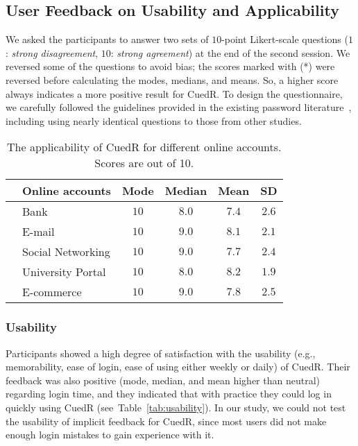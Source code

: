 \subsection{User Feedback on Usability and Applicability}\label{feedback}

We asked the participants to answer two sets of $10$-point Likert-scale questions ($1$: \textit{strong disagreement}, $10$: \textit{strong agreement}) at the end of the second session. We reversed some of the questions to avoid bias; the scores marked with (*) were reversed before calculating the modes, medians, and means. So, a higher score always indicates a more positive result for CuedR. To design the questionnaire, we carefully followed the guidelines provided in the existing password literature~\cite{geopass,ccp,passpoint3}, including using nearly identical questions to those from other studies.

\begin{table}[b]
\renewcommand{\arraystretch}{1.3}
\caption{The applicability of CuedR for different online
  accounts. Scores are out of 10.}
\vspace{0.2cm}
\centering
\begin{tabular}{c@{}lcccc}
\hline
\hspace{0.2cm}&\multicolumn{1}{c}{Online accounts}&Mode&Median&Mean&SD\\ 
\hline
& Bank&$10$&$8.0$&$7.4$&$2.6$\\ 
\cline{2-6}
& E-mail&$10$&$9.0$&$8.1$&$2.1$\\ 
\cline{2-6}
& Social Networking&$10$&$9.0$&$7.7$&$2.4$\\ 
\cline{2-6}
& University Portal&$10$&$8.0$&$8.2$&$1.9$\\ 
\cline{2-6}
& E-commerce&$10$&$9.0$&$7.8$&$2.5$\\ 
\hline
\end{tabular}
\label{tab:applicable}
\end{table}


\subsubsection{Usability} Participants showed a high degree of satisfaction with the usability (e.g., memorability, ease of login, ease of using either weekly or daily) of CuedR. Their feedback was also positive (mode, median, and mean higher than neutral) regarding login time, and they indicated that with practice they could log in quickly using CuedR (see~Table~\ref{tab:usability}). In our study, we could not test the usability of implicit feedback for CuedR, since most users did not make enough login mistakes to gain experience with it.

